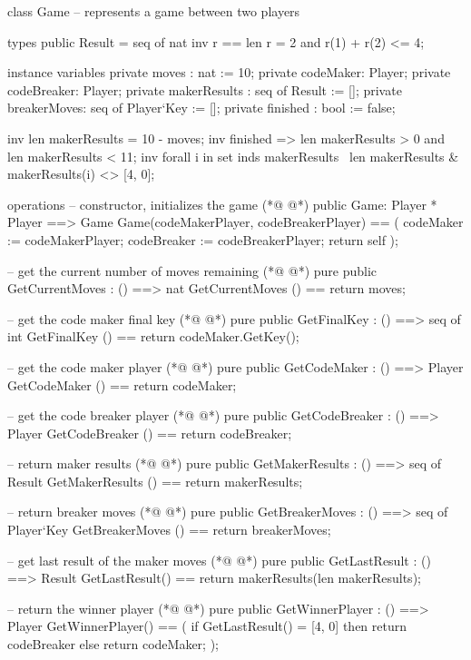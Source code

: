 \begin{vdmpp}[breaklines=true]
class Game -- represents a game between two players

types
 public Result = seq of nat
 inv r == len r = 2 and r(1) + r(2) <= 4;
  
instance variables
 private moves : nat := 10;
 private codeMaker: Player;
 private codeBreaker: Player;
 private makerResults : seq of Result := [];
 private breakerMoves: seq of Player`Key := [];
 private finished : bool := false;

inv len makerResults = 10 - moves;
inv finished => len makerResults > 0 and len makerResults < 11;
inv forall i in set inds makerResults \ {len makerResults} & makerResults(i) <> [4, 0];
        
operations
  -- constructor, initializes the game
(*@
\label{Game:21}
@*)
  public Game: Player * Player ==> Game
   Game(codeMakerPlayer, codeBreakerPlayer) == (
    codeMaker := codeMakerPlayer;
    codeBreaker := codeBreakerPlayer;
    return self
   );
   
  -- get the current number of moves remaining
(*@
\label{GetCurrentMoves:29}
@*)
  pure public GetCurrentMoves : () ==> nat
   GetCurrentMoves () == return moves;
  
  -- get the code maker final key
(*@
\label{GetFinalKey:33}
@*)
  pure public GetFinalKey : () ==> seq of int
   GetFinalKey () == return codeMaker.GetKey();
   
  -- get the code maker player
(*@
\label{GetCodeMaker:37}
@*)
  pure public GetCodeMaker : () ==> Player
   GetCodeMaker () == return codeMaker;
   
  -- get the code breaker player
(*@
\label{GetCodeBreaker:41}
@*)
  pure public GetCodeBreaker : () ==> Player
   GetCodeBreaker () == return codeBreaker;
   
  -- return maker results
(*@
\label{GetMakerResults:45}
@*)
  pure public GetMakerResults : () ==> seq of Result
   GetMakerResults () == return makerResults;
  
  -- return breaker moves 
(*@
\label{GetBreakerMoves:49}
@*)
  pure public GetBreakerMoves : () ==> seq of Player`Key
   GetBreakerMoves () == return breakerMoves;
  
  -- get last result of the maker moves
(*@
\label{GetLastResult:53}
@*)
  pure public GetLastResult : () ==> Result
   GetLastResult() == return makerResults(len makerResults);
  
  -- return the winner player 
(*@
\label{GetWinnerPlayer:57}
@*)
  pure public GetWinnerPlayer : () ==> Player
   GetWinnerPlayer() == (
    if GetLastResult() = [4, 0]
     then
      return codeBreaker
    else
     return codeMaker;
   );
   

\end{vdmpp}
